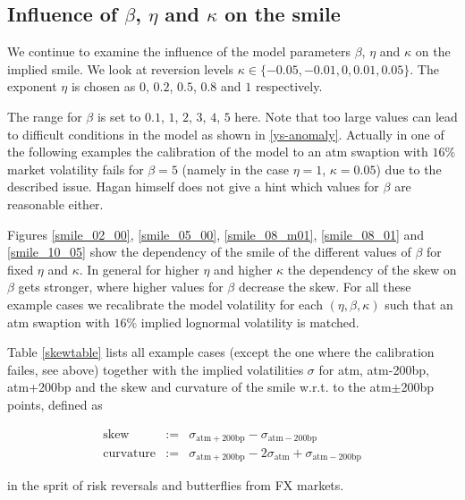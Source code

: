 \documentclass{amsart}
\theoremstyle{plain}
\numberwithin{equation}{section}
\begin{document}
\subsection{Influence of $\beta$, $\eta$ and $\kappa$ on the smile}

We continue to examine the influence of the model parameters $\beta$, $\eta$ and $\kappa$ on the implied smile. We look at reversion levels $\kappa \in \{ -0.05, -0.01, 0, 0.01 ,0.05 \}$. The exponent $\eta$ is chosen as $0$, $0.2$, $0.5$, $0.8$ and $1$ respectively. 

The range for $\beta$ is set to $0.1$, $1$, $2$, $3$, $4$, $5$ here. Note that too large values can lead to difficult conditions in the model as shown in \ref{ys-anomaly}. Actually in one of the following examples the calibration of the model to an atm swaption with $16\%$ market volatility fails for $\beta=5$ (namely in the case $\eta=1$, $\kappa=0.05$) due to the described issue. Hagan himself does not give a hint which values for $\beta$ are reasonable either.

Figures \ref{smile_02_00}, \ref{smile_05_00}, \ref{smile_08_m01}, \ref{smile_08_01} and \ref{smile_10_05} show the dependency of the smile of the different values of $\beta$ for fixed $\eta$ and $\kappa$. In general for higher $\eta$ and higher $\kappa$ the dependency of the skew on $\beta$ gets stronger, where higher values for $\beta$ decrease the skew. For all these example cases we recalibrate the model volatility for each $(\eta,\beta,\kappa)$ such that an atm swaption with $16\%$ implied lognormal volatility is matched.

Table \ref{skewtable} lists all example cases (except the one where the calibration failes, see above) together with the implied volatilities $\sigma$ for atm, atm-200bp, atm+200bp and the skew and curvature of the smile w.r.t. to the atm$\pm$200bp points, defined as

\begin{eqnarray}
\text{skew} & := & \sigma_{\text{atm}+200\text{bp}} - \sigma_{\text{atm}-200\text{bp}} \\
\text{curvature} & := & \sigma_{\text{atm}+200\text{bp}} -2\sigma_{\text{atm}} + \sigma_{\text{atm}-200\text{bp}}
\end{eqnarray}

in the sprit of risk reversals and butterflies from FX markets.
\end{document}
